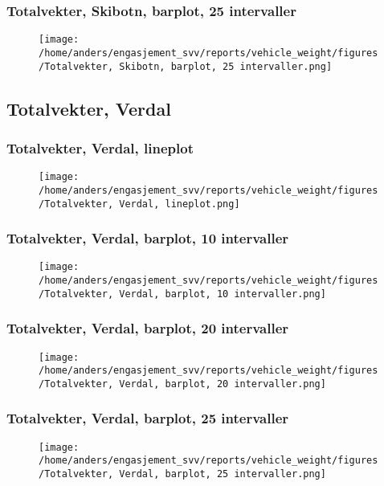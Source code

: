 \documentclass{article}
\begin{document}
\subsubsection{Totalvekter, Skibotn, barplot, 25 intervaller}
\begin{figure}[H]
\centering
\texttt{[image: /home/anders/engasjement\_svv/reports/vehicle\_weight/figures/Totalvekter, Skibotn, barplot, 25 intervaller.png]}
\end{figure}
\subsection{Totalvekter, Verdal}
\subsubsection{Totalvekter, Verdal, lineplot}
\begin{figure}[H]
\centering
\texttt{[image: /home/anders/engasjement\_svv/reports/vehicle\_weight/figures/Totalvekter, Verdal, lineplot.png]}
\end{figure}
\subsubsection{Totalvekter, Verdal, barplot, 10 intervaller}
\begin{figure}[H]
\centering
\texttt{[image: /home/anders/engasjement\_svv/reports/vehicle\_weight/figures/Totalvekter, Verdal, barplot, 10 intervaller.png]}
\end{figure}
\subsubsection{Totalvekter, Verdal, barplot, 20 intervaller}
\begin{figure}[H]
\centering
\texttt{[image: /home/anders/engasjement\_svv/reports/vehicle\_weight/figures/Totalvekter, Verdal, barplot, 20 intervaller.png]}
\end{figure}
\subsubsection{Totalvekter, Verdal, barplot, 25 intervaller}
\begin{figure}[H]
\centering
\texttt{[image: /home/anders/engasjement\_svv/reports/vehicle\_weight/figures/Totalvekter, Verdal, barplot, 25 intervaller.png]}
\end{figure}
\end{document}
